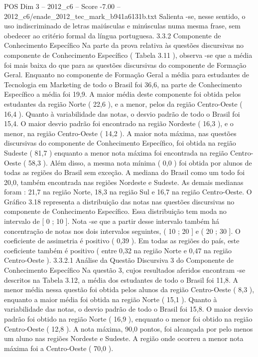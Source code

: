 \begin{textsample}{POS Dim 3 – 2012\_c6 – Score -7.00 – 2012\_c6/enade\_2012\_tec\_mark\_b941a6131b.txt}
Salienta -se, nesse sentido, o uso indiscriminado de letras maiúsculas e minúsculas numa mesma frase, sem obedecer ao critério formal da língua portuguesa. 3.3.2 Componente de Conhecimento Específico Na parte da prova relativa às questões discursivas no componente de Conhecimento Específico ( Tabela 3.11 ), observa -se que a média foi mais baixa do que para as questões discursivas do componente de Formação Geral.
Enquanto no componente de Formação Geral a média para estudantes de Tecnologia em Marketing de todo o Brasil foi 36,6, na parte de Conhecimento Específico a média foi 19,9.
A maior média deste componente foi obtida pelos estudantes da região Norte ( 22,6 ), e a menor, pelos da região Centro-Oeste ( 16,4 ).
Quanto à variabilidade das notas, o desvio padrão de todo o Brasil foi 15,4.
O maior desvio padrão foi encontrado na região Nordeste ( 16,3 ), e o menor, na região Centro-Oeste ( 14,2 ).
A maior nota máxima, nas questões discursivas do componente de Conhecimento Específico, foi obtida na região Sudeste ( 81,7 ) enquanto a menor nota máxima foi encontrada na região Centro-Oeste ( 58,3 ).
Além disso, a mesma nota mínima ( 0,0 ) foi obtida por alunos de todas as regiões do Brasil sem exceção.
A mediana do Brasil como um todo foi 20,0, também encontrada nas regiões Nordeste e Sudeste.
As demais medianas foram : 21,7 na região Norte, 18,3 na região Sul e 16,7 na região Centro-Oeste.
O Gráfico 3.18 representa a distribuição das notas nas questões discursivas no componente de Conhecimento Específico.
Essa distribuição tem moda no intervalo de [ 0 ; 10 ].
Nota -se que a partir desse intervalo também há concentração de notas nos dois intervalos seguintes, ( 10 ; 20 ] e ( 20 ; 30 ].
O coeficiente de assimetria é positivo ( 0,39 ).
Em todas as regiões do país, este coeficiente também é positivo ( entre 0,32 na região Norte e 0,47 na região Centro-Oeste ). 3.3.2.1 Análise da Questão Discursiva 3 do Componente de Conhecimento Específico Na questão 3, cujos resultados aferidos encontram -se descritos na Tabela 3.12, a média dos estudantes de todo o Brasil foi 11,8.
A menor média nessa questão foi obtida pelos alunos da região Centro-Oeste ( 8,3 ), enquanto a maior média foi obtida na região Norte ( 15,1 ).
Quanto à variabilidade das notas, o desvio padrão de todo o Brasil foi 15,8.
O maior desvio padrão foi obtido na região Norte ( 16,9 ), enquanto o menor foi obtido na região Centro-Oeste ( 12,8 ).
A nota máxima, 90,0 pontos, foi alcançada por pelo menos um aluno nas regiões Nordeste e Sudeste.
A região onde ocorreu a menor nota máxima foi a Centro-Oeste ( 70,0 ).

\end{textsample}
